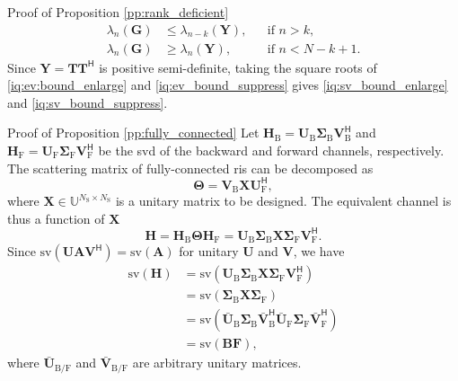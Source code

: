 \documentclass[journal]{IEEEtran}
\begin{document}
\begin{appendix}
\begin{subsection}{Proof of Proposition \ref{pp:rank_deficient}}
		\begin{align}
			\lambda_n(\mathbf{G}) & \le \lambda_{n-k}(\mathbf{Y}), && \text{if } n > k, \label{iq:ev:bound_enlarge} \\
			\lambda_n(\mathbf{G}) & \ge \lambda_n(\mathbf{Y}), && \text{if } n < N - k + 1 \label{iq:ev_bound_suppress}.
		\end{align}
		Since $\mathbf{Y} = \mathbf{T} \mathbf{T}^\mathsf{H}$ is positive semi-definite, taking the square roots of \eqref{iq:ev:bound_enlarge} and \eqref{iq:ev_bound_suppress} gives \eqref{iq:sv_bound_enlarge} and \eqref{iq:sv_bound_suppress}.
	\end{subsection}

	\begin{subsection}{Proof of Proposition \ref{pp:fully_connected}}\label{ap:fully_connected}
		Let $\mathbf{H}_\mathrm{B} = \mathbf{U}_\mathrm{B} \mathbf{\Sigma}_\mathrm{B} \mathbf{V}_\mathrm{B}^\mathsf{H}$ and $\mathbf{H}_\mathrm{F} = \mathbf{U}_\mathrm{F} \mathbf{\Sigma}_\mathrm{F} \mathbf{V}_\mathrm{F}^\mathsf{H}$ be the \gls{svd} of the backward and forward channels, respectively.
		The scattering matrix of fully-connected \gls{ris} can be decomposed as
		\begin{equation}
			\mathbf{\Theta} = \mathbf{V}_\mathrm{B} \mathbf{X} \mathbf{U}_\mathrm{F}^\mathsf{H},
			\label{eq:scattering_fc}
		\end{equation}
		where $\mathbf{X} \in \mathbb{U}^{N_\mathrm{S} \times N_\mathrm{S}}$ is a unitary matrix to be designed.
		The equivalent channel is thus a function of $\mathbf{X}$
		\begin{equation}
			\mathbf{H} = \mathbf{H}_\mathrm{B} \mathbf{\Theta} \mathbf{H}_\mathrm{F} = \mathbf{U}_\mathrm{B} \mathbf{\Sigma}_\mathrm{B} \mathbf{X} \mathbf{\Sigma}_\mathrm{F} \mathbf{V}_\mathrm{F}^\mathsf{H}.
			\label{eq:channel_equivalent_fc}
		\end{equation}
		Since $\mathrm{sv}(\mathbf{U} \mathbf{A} \mathbf{V}^\mathsf{H}) = \mathrm{sv}(\mathbf{A})$ for unitary $\mathbf{U}$ and $\mathbf{V}$, we have
		\begin{align*}
			\mathrm{sv}(\mathbf{H}) & = \mathrm{sv}(\mathbf{U}_\mathrm{B} \mathbf{\Sigma}_\mathrm{B} \mathbf{X} \mathbf{\Sigma}_\mathrm{F} \mathbf{V}_\mathrm{F}^\mathsf{H})\\
			& = \mathrm{sv}(\mathbf{\Sigma}_\mathrm{B} \mathbf{X} \mathbf{\Sigma}_\mathrm{F})\\
			& = \mathrm{sv}(\bar{\mathbf{U}}_\mathrm{B} \mathbf{\Sigma}_\mathrm{B} \mathbf{\bar{V}}_\mathrm{B}^\mathsf{H} \bar{\mathbf{U}}_\mathrm{F} \mathbf{\Sigma}_\mathrm{F} \mathbf{\bar{V}}_\mathrm{F}^\mathsf{H})\\
			& = \mathrm{sv}(\mathbf{BF}),
		\end{align*}
		where $\bar{\mathbf{U}}_{\mathrm{B}/\mathrm{F}}$ and $\bar{\mathbf{V}}_{\mathrm{B}/\mathrm{F}}$ are arbitrary unitary matrices.
	\end{subsection}


\end{appendix}
\end{document}
